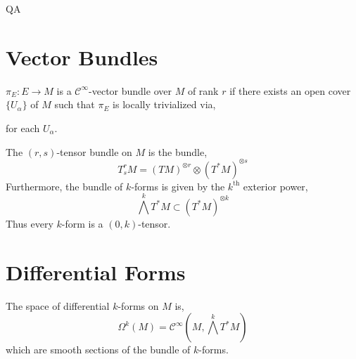 QA	 \documentclass[12pt]{extarticle}
\newcommand{\R}{\mathbb{R}}
\theoremstyle{definition}
\newenvironment{definition}[1][Definition:]{\begin{trivlist}
\item[\hskip \labelsep {\bfseries #1}]}{\end{trivlist}}
\newcommand{\C}[1]{\mathcal{C}^{#1}}
\begin{document}
\section{Vector Bundles}

\begin{definition}
$\pi_E : E \to M$ is a $\C{\infty}$-vector bundle over $M$ of rank $r$ if there exists an open cover $\{ U_\alpha \}$ of $M$ such that $\pi_E$ is locally trivialized via,
\begin{center}
\end{center}
for each $U_\alpha$.
\end{definition}


\begin{definition}
The $(r,s)$-tensor bundle on $M$ is the bundle,
\[ T^r_s M = (T M)^{\otimes r} \otimes (T^* M)^{\otimes s} \]
Furthermore, the bundle of $k$-forms is given by the $k^{\mathrm{th}}$ exterior power,
\[  \bigwedge^k T^* M \subset (T^*M)^{\otimes k} \]
Thus every $k$-form is a $(0,k)$-tensor.  
\end{definition}

\section{Differential Forms}

\begin{definition}
The space of differential $k$-forms on $M$ is,
\[ \Omega^k(M) = \mathcal{C}^{\infty}\left(M, \bigwedge^k T^* M\right) \]
which are smooth sections of the bundle of $k$-forms. 
\end{definition}
\end{document}
